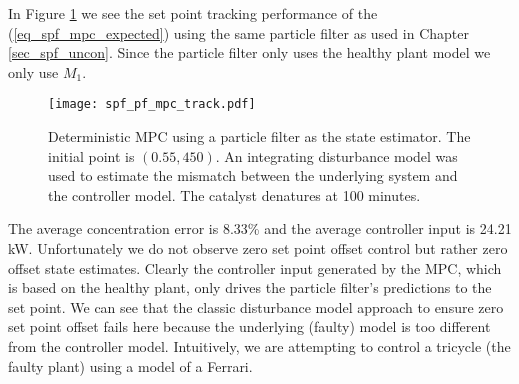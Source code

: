 In Figure \ref{fig_spf_pf_mpc_track} we see the set point tracking performance of the (\ref{eq_spf_mpc_expected}) using the same particle filter as used in Chapter \ref{sec_spf_uncon}. Since the particle filter only uses the healthy plant model we only use $M_1$. 
\begin{figure}[H] 
\centering
\texttt{[image: spf\_pf\_mpc\_track.pdf]}
\caption{Deterministic MPC using a particle filter as the state estimator. The initial point is $(0.55, 450)$. An integrating disturbance model was used to estimate the mismatch between the underlying system and the controller model. The catalyst denatures at 100 minutes.}
\label{fig_spf_pf_mpc_track}
\end{figure}
The average concentration error is 8.33\% and the average controller input is 24.21 kW. Unfortunately we do not observe zero set point offset control but rather zero offset state estimates. Clearly the controller input generated by the MPC, which is based on the healthy plant, only drives the particle filter's predictions to the set point. We can see that the classic disturbance model approach \cite{lee} to ensure zero set point offset fails here because the underlying (faulty) model is too different from the controller model. Intuitively, we are attempting to control a tricycle (the faulty plant) using a model of a Ferrari.  

